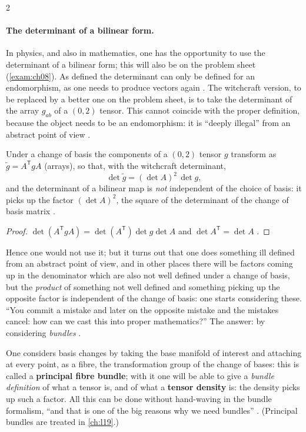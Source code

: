 \begin{paracol}{2}
\paragraph{The determinant of a bilinear form.} In physics, and also in mathematics, one has the opportunity to use the determinant of a bilinear form; this will also be on the problem sheet (\cref{exam:ch08}). As defined the determinant can only be defined for an endomorphism, as one needs to produce vectors again
. The witchcraft version, to be replaced by a better one on the problem sheet, is to take the determinant of the array $g_{ab}$ of a $(0,2)$ tensor. This cannot coincide with the proper definition, because the object needs to be an endomorphism: it is ``deeply illegal'' from an abstract point of view
.
\begin{proposition}\label{prop:te-detg}
Under a change of basis the components of a $(0,2)$ tensor $g$ transform as $\tilde g=A^{\mathsf T}gA$ (arrays), so that, with the witchcraft determinant,
\[
  \det\tilde g=(\det A)^2\,\det g,
\]
and the determinant of a bilinear map is \emph{not} independent of the choice of basis: it picks up the factor $(\det A)^2$, the square of the determinant of the change of basis matrix
.
\end{proposition}
\begin{proof}
$\det(A^{\mathsf T}gA)=\det(A^{\mathsf T})\det g\det A$ and $\det A^{\mathsf T}=\det A$ .
\end{proof}
Hence one would not use it; but it turns out that one does something ill defined from an abstract point of view, and in other places there will be factors coming up in the denominator which are also not well defined under a change of basis, but the \emph{product} of something not well defined and something picking up the opposite factor is independent of the
change of basis: one starts considering these. ``You commit a mistake and later on the opposite mistake and the mistakes cancel: how can we cast this into proper mathematics?'' The answer: by considering \emph{bundles} .
\begin{application}\label{app:te-density}
One considers basis changes by taking the base manifold of interest and attaching at every point, as a fibre, the transformation group of the change of bases: this is called a \textbf{principal fibre bundle}; with it one will be able to give a \emph{bundle definition} of what a tensor is, and of what a \textbf{tensor density} is: the density picks up such a factor. All this can be done without hand-waving in the bundle formalism, ``and
that is one of the big reasons why we need bundles'' . (Principal bundles are treated in \cref{ch:l19}.)
\end{application}


\end{paracol}

